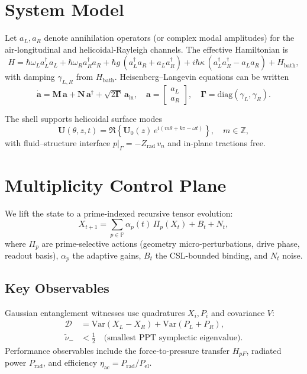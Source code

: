 \documentclass[11pt]{article}
\begin{document}
\section{System Model}
Let \(a_L,a_R\) denote annihilation operators (or complex modal amplitudes) for the air-longitudinal and helicoidal-Rayleigh channels. The effective Hamiltonian is
\begin{equation}
H = \hbar\omega_L a_L^\dagger a_L + \hbar\omega_R a_R^\dagger a_R
 + \hbar g\,(a_L^\dagger a_R + a_L a_R^\dagger)
 + i\hbar\kappa\,(a_L^\dagger a_R^\dagger - a_L a_R)
 + H_{\mathrm{bath}},
\label{eq:H}
\end{equation}
with damping \(\gamma_{L,R}\) from \(H_{\mathrm{bath}}\). Heisenberg--Langevin equations can be written
\begin{equation}
\dot{\mathbf a}=\mathbf M\,\mathbf a+\mathbf N\,\mathbf a^\dagger
 + \sqrt{2\mathbf \Gamma}\,\mathbf a_{\mathrm{in}},\quad
\mathbf a=\begin{bmatrix} a_L\\ a_R\end{bmatrix},\quad
\mathbf \Gamma=\mathrm{diag}(\gamma_L,\gamma_R).
\label{eq:HL}
\end{equation}

The shell supports helicoidal surface modes
\begin{equation}
\mathbf U(\theta,z,t)=\Re\!\left\{\mathbf U_0(z)\,e^{i(m\theta+k z-\omega t)}\right\},\quad m\in\mathbb Z,
\label{eq:helicoidal}
\end{equation}
with fluid--structure interface \(p|_{\Gamma}=-Z_{\mathrm{rad}}\,v_n\) and in-plane tractions free.

\section{Multiplicity Control Plane}
We lift the state to a prime-indexed recursive tensor evolution:
\begin{equation}
X_{t+1}=\sum_{p\in\mathbb P}\alpha_p(t)\,\Pi_p(X_t)+B_t+N_t,
\label{eq:PIRTM}
\end{equation}
where \(\Pi_p\) are prime-selective actions (geometry micro-perturbations, drive phase, readout basis), \(\alpha_p\) the adaptive gains, \(B_t\) the CSL-bounded binding, and \(N_t\) noise.

\subsection*{Key Observables}
Gaussian entanglement witnesses use quadratures \(X_i,P_i\) and covariance \(V\):
\begin{align}
\mathcal D &= \mathrm{Var}(X_L\!-\!X_R)+\mathrm{Var}(P_L\!+\!P_R), \label{eq:Duan}\\
\tilde \nu_- &<\frac{1}{2}\quad \text{(smallest PPT symplectic eigenvalue)}. \label{eq:PPT}
\end{align}
Performance observables include the force-to-pressure transfer \(H_{pF}\), radiated power \(P_{\mathrm{rad}}\), and efficiency \(\eta_{\mathrm{ac}}=P_{\mathrm{rad}}/P_{\mathrm{el}}\).
\end{document}
